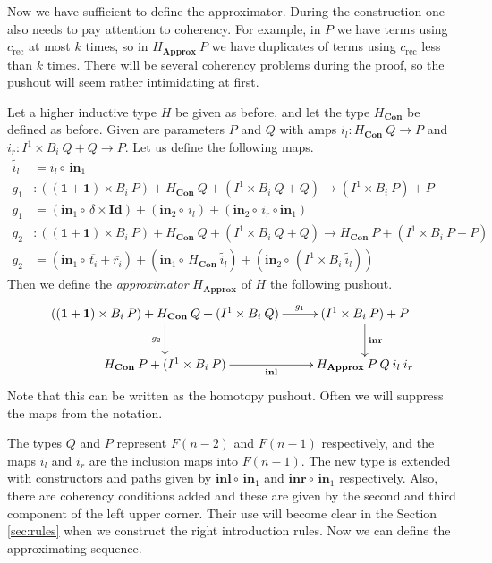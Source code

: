 \documentclass[a4paper,UKenglish]{lipics-v2016}
\newcommand{\Boperator}[1]{\mathrm{\mathbf{#1}}}
\newcommand{\inn}{\Boperator{in}}
\newcommand{\comp}[0]{\circ \,}
\newcommand{\one}[0]{\textbf{1}}
\newcommand{\rec}[0]{\operatorname{rec}}
\newcommand{\Con}[0]{\textbf{Con}}
\newcommand{\Approx}[0]{\textbf{Approx}}
\newcommand{\idmap}[0]{\Boperator{Id}}
\newcommand{\inl}[0]{\Boperator{inl}}
\newcommand{\inr}[0]{\Boperator{inr}}
\begin{document}
Now we have sufficient to define the approximator.
During the construction one also needs to pay attention to coherency.
For example, in $P$ we have terms using $c_{\rec}$ at most $k$ times, so in $H_{\Approx} \> P$ we have duplicates of terms using $c_{\rec}$ less than $k$ times.
There will be several coherency problems during the proof, so the pushout will seem rather intimidating at first.

\begin{definition}
Let a higher inductive type $H$ be given as before, and let the type $H_{\Con}$ be defined as before.
Given are parameters $P$ and $Q$ with amps $i_l : H_{\Con} \> Q \rightarrow P$ and $i_r : I^1 \times B_i \> Q + Q \rightarrow P$.
Let us define the following maps.
\begin{align*}
\widetilde{i_l} &= i_l \comp \inn_1\\
g_1 &: ((\one + \one) \times B_i \> P) + H_{\Con} \> Q  + (I^1 \times B_i \> Q + Q)\rightarrow (I^1 \times B_i \> P) + P\\
g_1 &= (\inn_1 \comp \delta \times \idmap) + (\inn_2 \comp i_l) + (\inn_2 \comp i_r \circ \inn_1)\\
g_2 &: ((\one + \one) \times B_i \> P) + H_{\Con} \> Q + (I^1 \times B_i \> Q + Q) \rightarrow H_{\Con} \> P + (I^1 \times B_i \> P + P)\\
g_2 &= (\inn_1 \comp \overline{t_i} + \overline{r_i})+ (\inn_1 \comp H_{\Con} \> \widetilde{i_l}) + (\inn_2 \comp (I^1 \times B_i \> \widetilde{i_l}))
\end{align*}
Then we define the \emph{approximator} $H_{\Approx}$ of $H$ the following pushout.
\[
\xymatrix
{
	((\one + \one) \times B_i \> P) + H_{\Con} \> Q + (I^1 \times B_i \> Q) 
	\ar[d]_{g_2} 
	\ar[r]^-{g_1}
	& (I^1 \times B_i \> P) + P  
	\ar[d]^-{\inr}\\
	H_{\Con} \> P + (I^1 \times B_i \> P)  
	\ar[r]_-{\inl} 
	& H_{\Approx} \> P \> Q \> i_l \> i_r
}
\]
Note that this can be written as the homotopy pushout.
Often we will suppress the maps from the notation.
\end{definition}

The types $Q$ and $P$ represent $F(n-2)$ and $F(n-1)$ respectively, and the maps $i_l$ and $i_r$ are the inclusion maps into $F(n-1)$.
The new type is extended with constructors and paths given by $\inl \comp \inn_1$ and $\inr \comp \inn_1$ respectively.
Also, there are coherency conditions added and these are given by the second and third component of the left upper corner.
Their use will become clear in the Section \ref{sec:rules} when we construct the right introduction rules.
Now we can define the approximating sequence.
\end{document}
